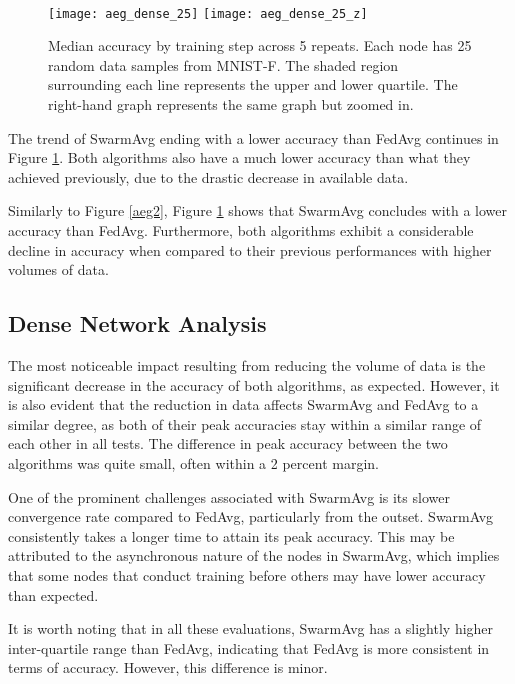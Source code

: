 \begin{figure}[H] 
	 \\
	\texttt{[image: aeg\_dense\_25]}
	\texttt{[image: aeg\_dense\_25\_z]}
	\caption{Median accuracy by training step across 5 repeats. Each node has 25 random data samples from MNIST-F. The shaded region surrounding each line represents the upper and lower quartile. The right-hand graph represents the same graph but zoomed in.}
	\label{aeg3}
\end{figure}

The trend of SwarmAvg ending with a lower accuracy than FedAvg continues in Figure \ref{aeg3}. Both algorithms also have a much lower accuracy than what they achieved previously, due to the drastic decrease in available data.

Similarly to Figure \ref{aeg2}, Figure \ref{aeg3} shows that SwarmAvg concludes with a lower accuracy than FedAvg. Furthermore, both algorithms exhibit a considerable decline in accuracy when compared to their previous performances with higher volumes of data.

\subsection{Dense Network Analysis}

The most noticeable impact resulting from reducing the volume of data is the significant decrease in the accuracy of both algorithms, as expected. However, it is also evident that the reduction in data affects SwarmAvg and FedAvg to a similar degree, as both of their peak accuracies stay within a similar range of each other in all tests. The difference in peak accuracy between the two algorithms was quite small, often within a 2 percent margin.

One of the prominent challenges associated with SwarmAvg is its slower convergence rate compared to FedAvg, particularly from the outset. SwarmAvg consistently takes a longer time to attain its peak accuracy. This may be attributed to the asynchronous nature of the nodes in SwarmAvg, which implies that some nodes that conduct training before others may have lower accuracy than expected.

It is worth noting that in all these evaluations, SwarmAvg has a slightly higher inter-quartile range than FedAvg, indicating that FedAvg is more consistent in terms of accuracy. However, this difference is minor.

